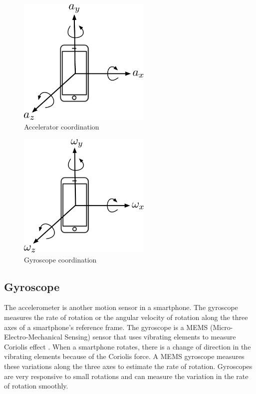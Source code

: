 \begin{figure}[!ht]
  \centering
  \includegraphics[width=2.5in]{figures/coord_acceleration.pdf}
  \caption{Accelerator coordination}
  \label{f:acc}
\end{figure}


\begin{figure}
  \centering
  \includegraphics[width=2.5in]{figures/coord_omega.pdf}
  \caption{Gyroscope coordination}
  \label{f:gyro}
\end{figure}
  


\subsection{Gyroscope}
The accelerometer is another motion sensor in a smartphone.
The gyroscope measures the rate of rotation or the angular velocity of rotation along the three axes of a smartphone's reference frame.
The gyroscope is a MEMS (Micro-Electro-Mechanical Sensing) sensor that uses vibrating elements to measure Coriolis effect \cite{coriolis}.
When a smartphone rotates, there is a change of direction in the vibrating elements because of the Coriolis force.
A MEMS gyroscope measures these variations along the three axes to estimate the rate of rotation.
Gyroscopes are very responsive to small rotations and can measure the variation in the rate of rotation smoothly.

